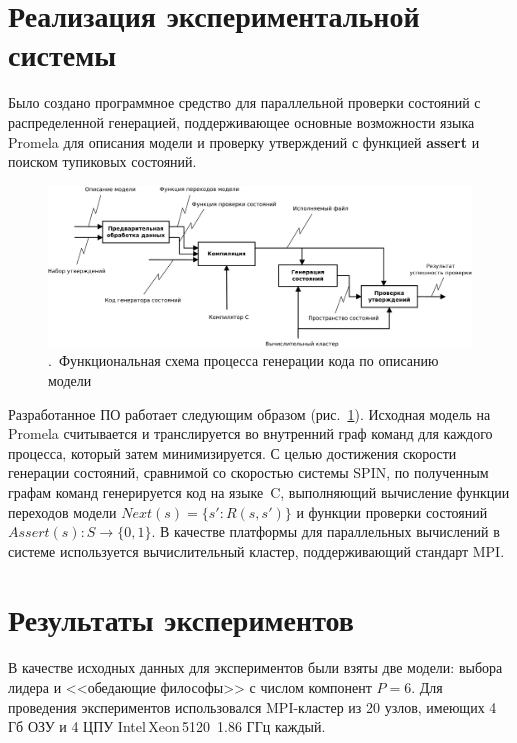 \documentclass[12pt,a4paper,article]{bpm2}
\begin{document}
\section{Реализация экспериментальной системы}
\label{sec:implementation}

Было создано программное средство для параллельной проверки состояний с распределенной генерацией, поддерживающее основные возможности языка Promela для описания модели и проверку утверждений с функцией \textbf{assert} и поиском тупиковых состояний.

\begin{figure}[ht]
  \centering
  \includegraphics[width=\textwidth]{graphics/stategen-idef0-simple.pdf}
  \caption{.~Функциональная схема процесса генерации кода по описанию модели}
  \label{fig:stategen-idef0-simple}
\end{figure}

Разработанное ПО работает следующим образом (рис.~\ref{fig:stategen-idef0-simple}). Исходная модель на Promela считывается и транслируется во внутренний граф команд для каждого процесса, который затем минимизируется.
С целью достижения скорости генерации состояний, сравнимой со скоростью системы SPIN, по полученным графам команд генерируется код на языке~C, выполняющий вычисление функции переходов модели $Next(s) = \{s': R(s, s')\}$ и функции проверки состояний $Assert(s): S \rightarrow \{0, 1\}$.
В качестве платформы для параллельных вычислений в системе используется вычислительный кластер, поддерживающий стандарт MPI.

\section{Результаты экспериментов}
\label{sec:experim}

В качестве исходных данных для экспериментов были взяты две модели: выбора лидера и <<обедающие философы>> с числом компонент $P = 6$.
Для проведения экспериментов использовался MPI-кластер из 20 узлов, имеющих 4 Гб ОЗУ и 4 ЦПУ Intel\,Xeon\,5120~1.86 ГГц каждый.
\end{document}
